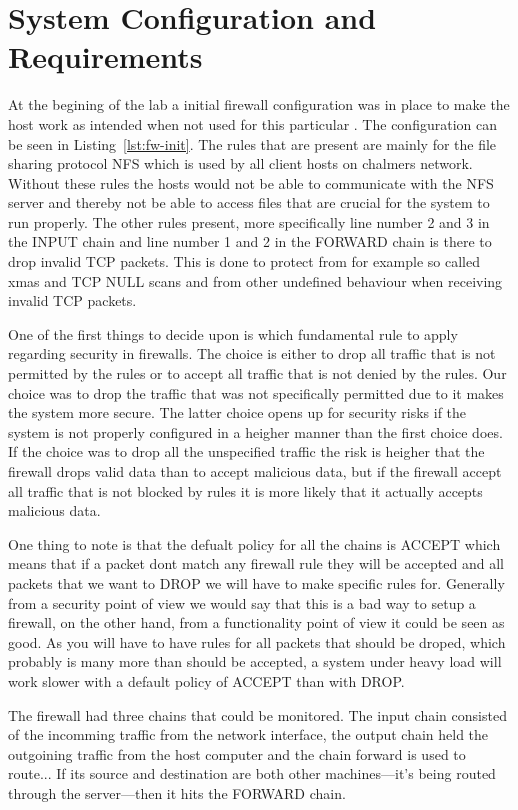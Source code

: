 \section{System Configuration and Requirements}
\label{sec:setup}

At the begining of the lab a initial firewall configuration was in place to make the host work as intended when not used for this particular \lab. The configuration can be seen in Listing~\ref{lst:fw-init}. The rules that are present are mainly for the file sharing protocol NFS which is used by all client hosts on chalmers network. Without these rules the hosts would not be able to communicate with the NFS server and thereby not be able to access files that are crucial for the system to run properly. The other rules present, more specifically line number 2 and 3 in the INPUT chain and line number 1 and 2 in the FORWARD chain is there to drop invalid TCP packets. This is done to protect from for example so called xmas and TCP NULL scans and from other undefined behaviour when receiving invalid TCP packets.


One of the first things to decide upon is which fundamental rule to apply regarding security in firewalls. The choice is either to drop all traffic that is not permitted by the rules or to accept all traffic that is not denied by the rules. Our choice was to drop the traffic that was not specifically permitted due to it makes the system more secure. The latter choice opens up for security risks if the system is not properly configured in a heigher manner than the first choice does. If the choice was to drop all the unspecified traffic the risk is heigher that the firewall drops valid data than to accept malicious data, but if the firewall accept all traffic that is not blocked by rules it is more likely that it actually accepts malicious data.

One thing to note is that the defualt policy for all the chains is ACCEPT which means that if a packet dont match any firewall rule they will be accepted and all packets that we want to DROP we will have to make specific rules for. Generally from a security point of view we would say that this is a bad way to setup a firewall, on the other hand, from a functionality point of view it could be seen as good. As you will have to have rules for all packets that should be droped, which probably is many more than should be accepted, a system under heavy load will work slower with a default policy of ACCEPT than with DROP.  



The firewall had three chains that could be monitored. The input chain consisted of the incomming traffic from the network interface, the output chain held the outgoining traffic from the host computer and the chain forward is used to route... If its source and destination are both other machines—it's being routed through the server—then it hits the FORWARD chain.



